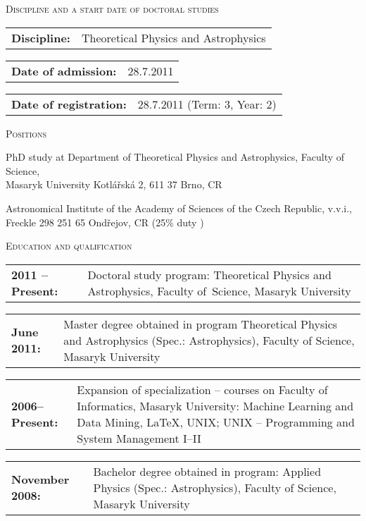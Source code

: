 \begin{cv}
\begin{cvlist}{\large \textsc{Discipline and a start date of doctoral studies}}
\item \begin{tabular}{p{4cm}p{11cm}} {\bf{Discipline:}} & Theoretical Physics and Astrophysics \end{tabular}
\item \begin{tabular}{p{4cm}p{11cm}} {\bf{Date of admission:}}  &  28.7.2011\end{tabular}
\item \begin{tabular}{p{4cm}p{11cm}} {\bf{Date of registration:}} & 28.7.2011 (Term: 3, Year: 2)\end{tabular}
\end{cvlist}




\begin{cvlist}{\large \textsc{Positions}}
\item PhD study at Department of Theoretical Physics and Astrophysics, Faculty of Science,\\ Masaryk University Kotl\'{a}\v{r}sk\'{a} 2, 611 37 Brno, CR
\item Astronomical Institute of the Academy of Sciences of the Czech
  Republic, v.v.i.,\\ Freckle 298 251 65 Ondřejov, CR (25\% duty )
\end{cvlist}

\noindent\hrulefill
\begin{cvlist}{\large \textsc{Education and qualification}}
\item \begin{tabular}{p{2.8cm}p{11cm}} \vspace{0.2cm} {\bf{2011 --
      Present:}} & \vspace{0.2cm} Doctoral study program:
  Theoretical Physics and Astrophysics, Faculty of~Science, Masaryk
  University
 \end{tabular}
 \item \begin{tabular}{p{2.8cm}p{11cm}} {\bf{June 2011:}} & Master
   degree obtained in program Theoretical Physics and Astrophysics
   (Spec.: Astrophysics), Faculty of Science, Masaryk University
\end{tabular}
\item \begin{tabular}{p{2.8cm}p{11cm}} {\bf{2006--Present:}} &
  Expansion of specialization -- courses on Faculty of Informatics,
  Masaryk University: Machine Learning and Data Mining, \LaTeX, UNIX;
  UNIX -- Programming and System Management I--II
 \end{tabular}
  \item \begin{tabular}{p{2.8cm}p{11cm}} {\bf{November 2008:}} &
    Bachelor degree obtained in program: Applied Physics (Spec.:
    Astrophysics), Faculty of Science, Masaryk University
  \end{tabular}


\end{cvlist}
\end{cv}
